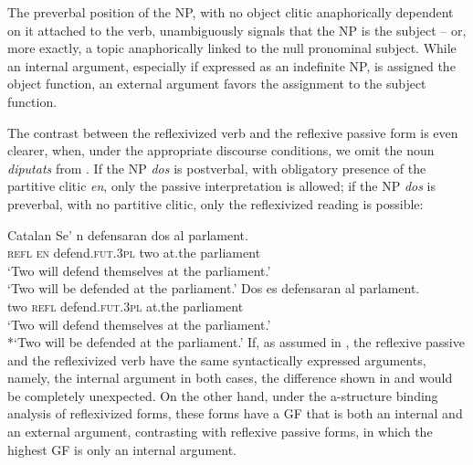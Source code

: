 \documentclass[output=paper,hidelinks]{langscibook}
\begin{document}
The preverbal position of the NP, with no object clitic anaphorically dependent on it attached to the verb, unambiguously signals that the NP is the subject -- or, more exactly, a topic anaphorically linked to the null pronominal subject. While an internal argument, especially if expressed as an indefinite NP, is assigned the object function, an external argument favors the assignment to the subject function.

The contrast between the reflexivized verb and the reflexive passive form is even clearer, when, under the appropriate discourse conditions, we omit the noun \textit{diputats} from . If the NP \textit{dos} is postverbal, with obligatory presence of the partitive clitic \textit{en}, only the passive interpretation is allowed; if the NP \textit{dos} is preverbal, with no partitive clitic, only the reflexivized reading is possible:

\ea\label{ex:Romance:32}   Catalan
\ea\label{ex:Romance:32a}
\gll Se' n defensaran dos al parlament.\\
       \textsc{refl} \textsc{en} defend.\textsc{fut.3pl} two at.the parliament\\
\glt      *`Two will defend themselves at the parliament.'\\
`Two will be defended at the parliament.'
\ex\label{ex:Romance:32b}
\gll
Dos es defensaran al parlament.\\
two \textsc{refl} defend.\textsc{fut.3pl} at.the parliament\\
\glt `Two will defend themselves at the parliament.'\\
*`Two will be defended at the parliament.'
\z\z
If, as assumed in \citet{Grimshaw90}, the reflexive passive and the reflexivized verb have the same syntactically expressed arguments, namely, the internal argument in both cases, the difference shown in  and  would be completely unexpected. On the other hand, under the a-structure binding analysis of reflexivized forms, these forms have a GF that is both an internal and an external argument, contrasting with reflexive passive forms, in which the highest GF is only an internal argument.
\end{document}

